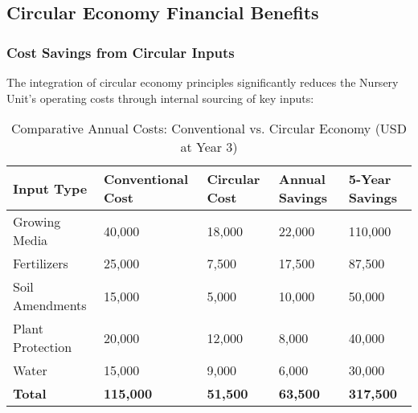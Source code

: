 \subsection{Circular Economy Financial Benefits} \label{sec:circular_economy_benefits}

\subsubsection{Cost Savings from Circular Inputs}
The integration of circular economy principles significantly reduces the Nursery Unit's operating costs through internal sourcing of key inputs:

\begin{table}[h]
\centering
\begin{tabular}{p{}p{}p{}p{}p{}}
\hline
\textbf{Input Type} & \textbf{Conventional Cost} & \textbf{Circular Cost} & \textbf{Annual Savings} & \textbf{5-Year Savings} \\
\hline
Growing Media & 40,000 & 18,000 & 22,000 & 110,000 \\
Fertilizers & 25,000 & 7,500 & 17,500 & 87,500 \\
Soil Amendments & 15,000 & 5,000 & 10,000 & 50,000 \\
Plant Protection & 20,000 & 12,000 & 8,000 & 40,000 \\
Water & 15,000 & 9,000 & 6,000 & 30,000 \\
\hline
\textbf{Total} & \textbf{115,000} & \textbf{51,500} & \textbf{63,500} & \textbf{317,500} \\
\hline
\end{tabular}
\caption{Comparative Annual Costs: Conventional vs. Circular Economy (USD at Year 3)}
\end{table}

